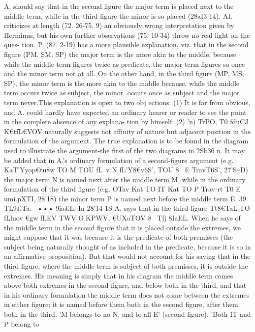 {{A. should say that in the second figure the major term is placed
next to the middle term, while in the third figure the minor is
so placed (28aI3-14). AI. criticizes at length (72. 26-75. 9) an
obviously wrong interpretation given by Herminus, but his own
further observations (75. 10-34) throw no real light on the ques-
tion. P. (87. 2-19) has a more plausible explanation, viz. that in
the second figure (PM, SM, SP) the major term is the more akin
to the middle, because while the middle term figures twice as
predicate, the major term figures so once and the minor term not
at all. On the other hand, in the third figure (MP, MS, SP), the
minor term is the more akin to the middle because, while the
middle term occurs twice as subject, the minor .occurs once as
subject and the major term never.This explanation is open to two obj ections. (1) It is far from
obvious, and A. could hardly have expected an ordinary hearer
or reader to see the point in the complete absence of any explana-
tion by himself. (2) 'n) TrPO, T0 fduC{J K€tfL€VOV naturally suggests
not affinity of nature but adjacent position in the formulation
of the argument. The true explanation is to be found in the
diagram used to illustrate the argument-the first of the two
diagrams in 2Sb36 n. It may be added that in A.'s ordinary
formulation of a second-figure argument (e.g. KaT'Y}yop€tu8w TO
M TOU fL~v N fL'Y}8€v6S', TOU 8~ E TravT6S', 27'S--D) the major term N
is named next after the middle term M, while in the ordinary
formulation of the third figure (e.g. OTav Kat TO IT Kat TO P Trav-rt
T0 E umi.pXTI, 28'18) the minor term P is named next before the
middle term E.
39. TL9£Ta.~ ••• 9ia£L. In 28'14-1S A. says that in the third
figure Tt8€TaL TO fLluov €gw fLEV TWV O.KPWV, €UXaTOV 8~ Tfj 8IaEL.
When he says of the middle term in the second figure that it is
placed outside the extremes, we might suppose that it was
because it is the predicate of both premisses (the subject being
naturally thought of as included in the predicate, because it is
so in an affirmative proposition). But that would not account
for his saying that in the third figure, where the middle term is
subject of both premisses, it is outside the extremes. His meaning
is simply that in his diagram the middle term comes above both
extremes in the second figure, and below both in the third, and
that in his ordinary formulation the middle term does not come
between the extremes in either figure; it is named before them
both in the second figure, after them both in the third. 'M belongs
to no N, and to all E' (second figure). 'Both IT and P belong to
}
